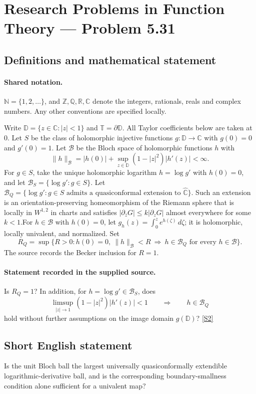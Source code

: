 \documentclass[11pt]{article}
\newcommand{\sref}[2]{\hyperlink{source:#1:#2}{[S#2]}}
\begin{document}
\section{Research Problems in Function Theory — Problem 5.31}\label{statement}

\subsection{Definitions and mathematical statement}

\paragraph{Shared notation.}$\mathbb N=\{1,2,\ldots\}$, and $\mathbb Z,\mathbb Q,\mathbb R,\mathbb C$ denote the integers, rationals, reals and complex numbers. Any other conventions are specified locally.


Write $\mathbb D=\{z\in\mathbb C:|z|<1\}$ and $\mathbb T=\partial\mathbb D$. All Taylor coefficients below are taken at $0$. Let $S$ be the class of holomorphic injective functions $g:\mathbb D\to\mathbb C$ with $g(0)=0$ and $g'(0)=1$. Let $\mathcal B$ be the Bloch space of holomorphic functions $h$ with
\[\|h\|_{\mathcal B}=|h(0)|+\sup_{z\in\mathbb D}(1-|z|^2)|h'(z)|<\infty.
\]
For $g\in S$, take the unique holomorphic logarithm $h=\log g'$ with $h(0)=0$, and let $\mathcal B_S=\{\log g':g\in S\}$. Let $\mathcal B_Q=\{\log g':g\in S\text{ admits a quasiconformal extension to }\widehat{\mathbb C}\}$. Such an extension is an orientation-preserving homeomorphism of the Riemann sphere that is locally in $W^{1,2}$ in charts and satisfies $|\partial_{\bar z}G|\le k|\partial_zG|$ almost everywhere for some $k<1$.For $h\in\mathcal B$ with $h(0)=0$, let $g_h(z)=\int_0^z e^{h(\zeta)}\,d\zeta$; it is holomorphic, locally univalent, and normalized. Set
\[R_Q=\sup\{R>0:h(0)=0,\ \|h\|_{\mathcal B}<R\ \Longrightarrow\ h\in\mathcal B_Q\text{ for every }h\in\mathcal B\}.
\]
The source records the Becker inclusion for $R=1$.
\paragraph{Statement recorded in the supplied source.}
Is $R_Q=1$? In addition, for $h=\log g'\in\mathcal B_S$, does
\[\limsup_{|z|\to1}(1-|z|^2)|h'(z)|<1\qquad\Longrightarrow\qquad h\in\mathcal B_Q
\]
hold without further assumptions on the image domain $g(\mathbb D)$? \sref{statement}{2}
\subsection{Short English statement}
Is the unit Bloch ball the largest universally quasiconformally extendible logarithmic-derivative ball, and is the corresponding boundary-smallness condition alone sufficient for a univalent map?
\end{document}
